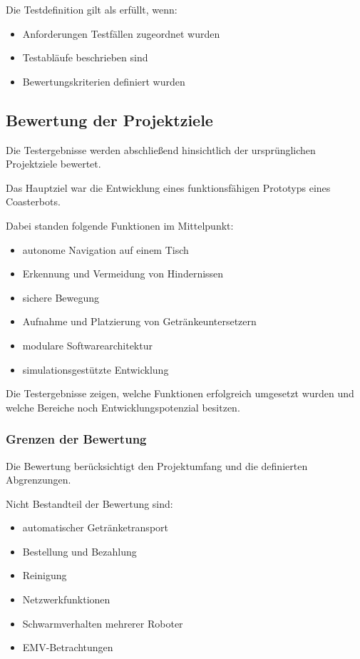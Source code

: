 Die Testdefinition gilt als erfüllt, wenn:

\begin{itemize}
\tightlist
\item
  Anforderungen Testfällen zugeordnet wurden
\item
  Testabläufe beschrieben sind
\item
  Bewertungskriterien definiert wurden
\end{itemize}

\subsection{Bewertung der
Projektziele}\label{bewertung-der-projektziele}

Die Testergebnisse werden abschließend hinsichtlich der ursprünglichen
Projektziele bewertet.

Das Hauptziel war die Entwicklung eines funktionsfähigen Prototyps eines
Coasterbots.

Dabei standen folgende Funktionen im Mittelpunkt:

\begin{itemize}
\tightlist
\item
  autonome Navigation auf einem Tisch
\item
  Erkennung und Vermeidung von Hindernissen
\item
  sichere Bewegung
\item
  Aufnahme und Platzierung von Getränkeuntersetzern
\item
  modulare Softwarearchitektur
\item
  simulationsgestützte Entwicklung
\end{itemize}

Die Testergebnisse zeigen, welche Funktionen erfolgreich umgesetzt
wurden und welche Bereiche noch Entwicklungspotenzial besitzen.

\subsubsection{Grenzen der Bewertung}\label{grenzen-der-bewertung}

Die Bewertung berücksichtigt den Projektumfang und die definierten
Abgrenzungen.

Nicht Bestandteil der Bewertung sind:

\begin{itemize}
\tightlist
\item
  automatischer Getränketransport
\item
  Bestellung und Bezahlung
\item
  Reinigung
\item
  Netzwerkfunktionen
\item
  Schwarmverhalten mehrerer Roboter
\item
  EMV-Betrachtungen
\end{itemize}

